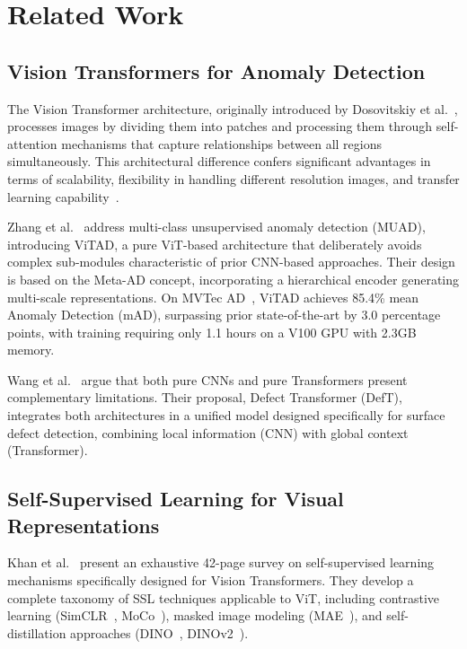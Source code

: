 \documentclass[journal,twoside,web]{ieeecolor}
\begin{document}
\section{Related Work}
\label{sec:related}

\subsection{Vision Transformers for Anomaly Detection}

The Vision Transformer architecture, originally introduced by Dosovitskiy et al.~\cite{dosovitskiy2021vit}, processes images by dividing them into patches and processing them through self-attention mechanisms that capture relationships between all regions simultaneously. This architectural difference confers significant advantages in terms of scalability, flexibility in handling different resolution images, and transfer learning capability~\cite{sudarshan2025object}.

Zhang et al.~\cite{zhang2025exploring} address multi-class unsupervised anomaly detection (MUAD), introducing ViTAD, a pure ViT-based architecture that deliberately avoids complex sub-modules characteristic of prior CNN-based approaches. Their design is based on the Meta-AD concept, incorporating a hierarchical encoder generating multi-scale representations. On MVTec AD~\cite{bergmann2019mvtec}, ViTAD achieves 85.4\% mean Anomaly Detection (mAD), surpassing prior state-of-the-art by 3.0 percentage points, with training requiring only 1.1 hours on a V100 GPU with 2.3GB memory.

Wang et al.~\cite{wang2022defect} argue that both pure CNNs and pure Transformers present complementary limitations. Their proposal, Defect Transformer (DefT), integrates both architectures in a unified model designed specifically for surface defect detection, combining local information (CNN) with global context (Transformer).

\subsection{Self-Supervised Learning for Visual Representations}

Khan et al.~\cite{khan2024survey} present an exhaustive 42-page survey on self-supervised learning mechanisms specifically designed for Vision Transformers. They develop a complete taxonomy of SSL techniques applicable to ViT, including contrastive learning (SimCLR~\cite{chen2020simclr}, MoCo~\cite{he2020moco}), masked image modeling (MAE~\cite{he2022mae}), and self-distillation approaches (DINO~\cite{caron2021dino}, DINOv2~\cite{oquab2024dinov2}).
\end{document}
